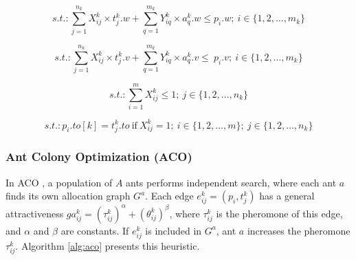 \documentclass[preprint,authoryear]{elsarticle}
\begin{document}
\begin{equation} 
	s.t.: \sum_{j=1}^{n_k} X_{ij}^k \times t_j^k.w + \sum_{q=1}^{m_k} Y_{iq}^k \times a_q^k.w  \leq p_i.w; \ i \in \{1, 2, \ldots, m_k\}
\end{equation}

\begin{equation} 
	s.t.: \sum_{j=1}^{n_k} X_{ij}^k \times t_j^k.v + \sum_{q=1}^{m_k} Y_{iq}^k \times a_q^k.v  \leq\ p_i.v; \ i \in \{1, 2, \ldots, m_k\}
\end{equation}

\begin{equation} 
	s.t.: \sum_{i=1}^{m} X_{ij}^k \leq 1; \ j \in \{1, 2, \ldots, n_k\}
\end{equation}

\begin{equation} \label{eq:lastnew}
	s.t.: p_i.to[k] = t^k_j.to\ \mbox{if} \ X_{ij}^k = 1; \ i \in \{1, 2, \ldots, m\}; \ j \in \{1, 2, \ldots, n_k\}
\end{equation}




\subsubsection{Ant Colony Optimization (ACO)}

In ACO \cite{Dorigo1992}, a population of $A$\/ ants performs independent search, where each ant $a$\/ finds its own allocation graph $G^a$. Each edge $e^k_{ij}=(p_i,t^k_j)$\/ has a general attractiveness $ga^k_{ij} = (\tau^k_{ij})^\alpha + (\theta^k_{ij})^\beta$, where $\tau^k_{ij}$\/ is the pheromone of this edge, and $\alpha$\/ and $\beta$\/ are constants. If $e^k_{ij}$\/ is included in $G^a$, ant $a$\/ increases the pheromone $\tau^k_{ij}$. Algorithm \ref{alg:aco} presents this heuristic.
\end{document}
